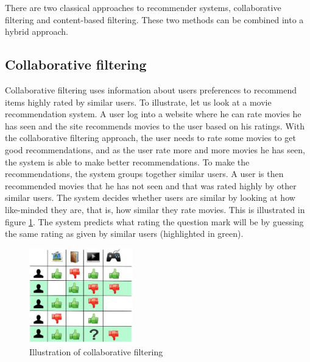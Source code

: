 There are two classical approaches to recommender systems, collaborative filtering and content-based filtering. These two methods can be combined into a hybrid approach.

\subsection{Collaborative filtering}
Collaborative filtering uses information about users preferences to recommend items highly rated by similar users. To illustrate, let us look at a movie recommendation system. A user log into a website where he can rate movies he has seen and the site recommends movies to the user based on his ratings. With the collaborative filtering approach, the user needs to rate some movies to get good recommendations, and as the user rate more and more movies he has seen, the system is able to make better recommendations. To make the recommendations, the system groups together similar users. A user is then recommended movies that he has not seen and that was rated highly by other similar users. The system decides whether users are similar by looking at how like-minded they are, that is, how similar they rate movies. This is illustrated in figure \ref{fig:collaborative-filtering}. The system predicts what rating the question mark will be by guessing the same rating as given by similar users (highlighted in green).

\begin{figure}[htp]
	\centering
	\includegraphics[width=0.4\textwidth]{fig/collab-filtering.png}
	\caption{Illustration of collaborative filtering}
	\label{fig:collaborative-filtering}
\end{figure}

